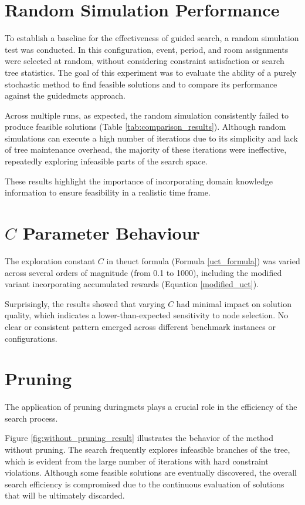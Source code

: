 \section{Random Simulation Performance}

To establish a baseline for the effectiveness of guided search, a random simulation test was conducted.  In this configuration, event, period, and room assignments were selected at random, without considering constraint satisfaction or search tree statistics. The goal of this experiment was to evaluate the ability of a purely stochastic method to find feasible solutions and to compare its performance against the guided\ac{mcts} approach. 

Across multiple runs, as expected, the random simulation consistently failed to produce feasible solutions (Table \ref{tab:comparison_results}). Although random simulations can execute a high number of iterations due to its simplicity and lack of tree maintenance overhead, the majority of these iterations were ineffective, repeatedly exploring infeasible parts of the search space. 

These results highlight the importance of incorporating domain knowledge information to ensure feasibility in a realistic time frame.

\section{\(C\) Parameter Behaviour}

The exploration constant \(C\) in the\ac{uct} formula (Formula \ref{uct_formula}) was varied across several orders of magnitude (from 0.1 to 1000), including the modified variant incorporating accumulated rewards (Equation \ref{modified_uct}). 

Surprisingly, the results showed that varying \(C\) had minimal impact on solution quality, which indicates a lower-than-expected sensitivity to node selection. No clear or consistent pattern emerged across different benchmark instances or configurations.

\section{Pruning}

The application of pruning during\ac{mcts} plays a crucial role in the efficiency of the search process.

Figure \ref{fig:without_pruning_result} illustrates the behavior of the method without pruning. The search frequently explores infeasible branches of the tree, which is evident from the large number of iterations with hard constraint violations. Although some feasible solutions are eventually discovered, the overall search efficiency is compromised due to the continuous evaluation of solutions that will be ultimately discarded.

